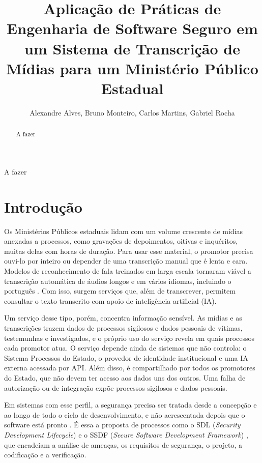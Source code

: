 \documentclass[12pt]{article}
\title{Aplicação de Práticas de Engenharia de Software Seguro em um Sistema de Transcrição de Mídias para um Ministério Público Estadual}
\author{Alexandre Alves\inst{1}, Bruno Monteiro\inst{1}, Carlos Martins\inst{1}, Gabriel Rocha\inst{1}}
\begin{document}
    \maketitle

    \begin{abstract}
        A fazer
    \end{abstract}

    \begin{resumo}
        A fazer
    \end{resumo}

    \section{Introdução}
    \label{sec:intro}

    Os Ministérios Públicos estaduais lidam com um volume crescente de mídias anexadas a processos, como gravações de depoimentos, oitivas e inquéritos, muitas delas com horas de duração. Para usar esse material, o promotor precisa ouvi-lo por inteiro ou depender de uma transcrição manual que é lenta e cara. Modelos de reconhecimento de fala treinados em larga escala tornaram viável a transcrição automática de áudios longos e em vários idiomas, incluindo o português \cite{radford:23}. Com isso, surgem serviços que, além de transcrever, permitem consultar o texto transcrito com apoio de inteligência artificial (IA).

    Um serviço desse tipo, porém, concentra informação sensível. As mídias e as transcrições trazem dados de processos sigilosos e dados pessoais de vítimas, testemunhas e investigados, e o próprio uso do serviço revela em quais processos cada promotor atua. O serviço depende ainda de sistemas que não controla: o Sistema Processos do Estado, o provedor de identidade institucional e uma IA externa acessada por API. Além disso, é compartilhado por todos os promotores do Estado, que não devem ter acesso aos dados uns dos outros. Uma falha de autorização ou de integração expõe processos sigilosos e dados pessoais.

    Em sistemas com esse perfil, a segurança precisa ser tratada desde a concepção e ao longo de todo o ciclo de desenvolvimento,
    e não acrescentada depois que o software está pronto \cite{mcgraw:06}. É essa a proposta de processos como o SDL (\textit{Security Development Lifecycle}) \cite{howard:06} e o SSDF (\textit{Secure Software Development Framework}) \cite{nist:ssdf}, que encadeiam a análise de ameaças, os requisitos de segurança, o projeto, a codificação e a verificação.
\end{document}
